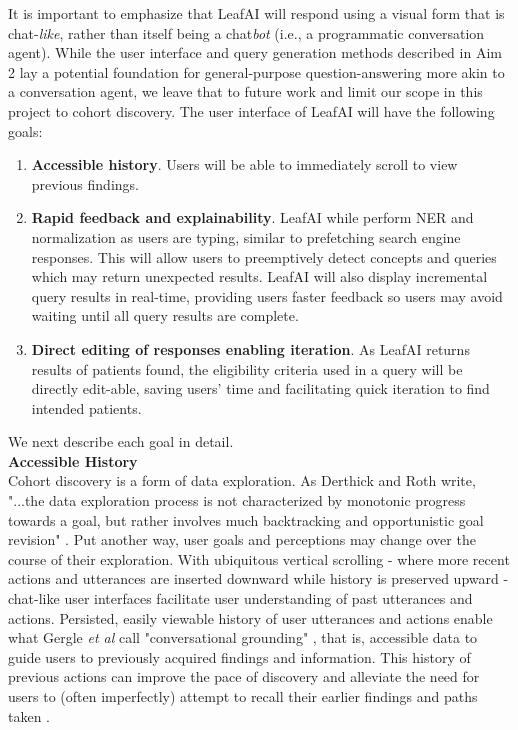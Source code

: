 \documentclass[../main.tex]{subfiles}
\begin{document}
It is important to emphasize that LeafAI will respond using a visual form that is chat-\textit{like}, rather than itself being a chat\textit{bot} (i.e., a programmatic conversation agent). While the user interface and query generation methods described in Aim 2 lay a potential foundation for general-purpose question-answering more akin to a conversation agent, we leave that to future work and limit our scope in this project to cohort discovery. The user interface of LeafAI will have the following goals:

\begin{enumerate}
    \item \textbf{Accessible history}. Users will be able to immediately scroll to view previous findings.
    \item \textbf{Rapid feedback and explainability}. LeafAI while perform NER and normalization as users are typing, similar to prefetching search engine responses. This will allow users to preemptively detect concepts and queries which may return unexpected results. LeafAI will also display incremental query results in real-time, providing users faster feedback so users may avoid waiting until all query results are complete.
    \item \textbf{Direct editing of responses enabling iteration}. As LeafAI returns results of patients found, the eligibility criteria used in a query will be directly edit-able, saving users' time and facilitating quick iteration to find intended patients.
\end{enumerate}

\noindent We next describe each goal in detail. \\

\noindent \textbf{Accessible History} \\
Cohort discovery is a form of data exploration. As Derthick and Roth write, "...the data exploration process is not characterized by monotonic progress towards a goal, but rather involves much backtracking and opportunistic goal revision" \cite{derthick2001enhancing}. Put another way, user goals and perceptions may change over the course of their exploration. With ubiquitous vertical scrolling - where more recent actions and utterances are inserted downward while history is preserved upward - chat-like user interfaces facilitate user understanding of past utterances and actions. Persisted, easily viewable history of user utterances and actions enable what Gergle \textit{et al} call "conversational grounding" \cite{gergle2004persistence}, that is, accessible data to guide users to previously acquired findings and information. This history of previous actions can improve the pace of discovery and alleviate the need for users to (often imperfectly) attempt to recall their earlier findings and paths taken \cite{hill1994history, gergle2004persistence}. \\
\end{document}
